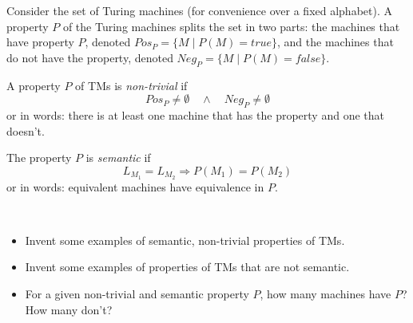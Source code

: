 Consider the set of Turing machines (for convenience over a fixed
alphabet). A property $P$ of the Turing machines splits the set in two
parts: the machines that have property $P$, denoted
%
$Pos_P = \{M\mid P(M) = \mathit{true}\}$, and the machines that do not have the
property, denoted
%
$Neg_P = \{M\mid P(M) = \mathit{false}\}$.

\begin{definition}
A property $P$ of TMs is {\em non-trivial} if
\begin{equation*}
	Pos_P \neq \emptyset \quad\wedge\quad Neg_P \neq \emptyset
\end{equation*}
or in words: there is at least one machine that has the property and one that doesn't.
\end{definition}

\begin{definition}
The property $P$ is {\em semantic} if
\begin{equation*}
	L_{M_1} = L_{M_2} \Longrightarrow P(M_1) = P(M_2)
\end{equation*}
or in words: equivalent machines have equivalence in $P$.
\end{definition}

\begin{exercise}
~
\begin{itemize}
\item Invent some examples of semantic, non-trivial
properties of TMs.

\item Invent some examples of properties of TMs that are not semantic.

\item For a given non-trivial and semantic property $P$, how many
machines have $P$? How many don't?
\end{itemize}
\end{exercise}



